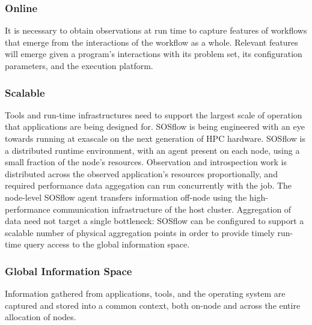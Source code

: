 \subsubsection{Online}
%
It is necessary to obtain observations at run time to capture features
of workflows that emerge from the interactions of the workflow as a
whole.
%
Relevant features will emerge given a program's interactions
with its problem set, its configuration parameters, and the execution platform.
%
\subsubsection{Scalable}
%
Tools and run-time infrastructures need to support the largest scale of
operation that applications are being designed for.
%
SOSflow is being engineered with an eye towards running at exascale
on the next generation of HPC hardware.
%
SOSflow is a distributed runtime environment, with an agent present
on each node, using a small fraction of the node's resources.
%
Observation and introspection work is distributed across
the observed application's resources proportionally, and required
performance data aggegation can run concurrently with the job.
%
The node-level SOSflow agent transfers information off-node using
the high-performance communication infrastructure of the host cluster.
%
Aggregation of data need not target a single bottleneck: SOSflow can
be configured to support a scalable number of physical aggregation
points in order to provide timely run-time query access to the global
information space.
%
\subsubsection{Global Information Space}
       Information gathered from applications, tools, and the
       operating system are captured and stored into a common context,
       both on-node and across the entire allocation of nodes.

